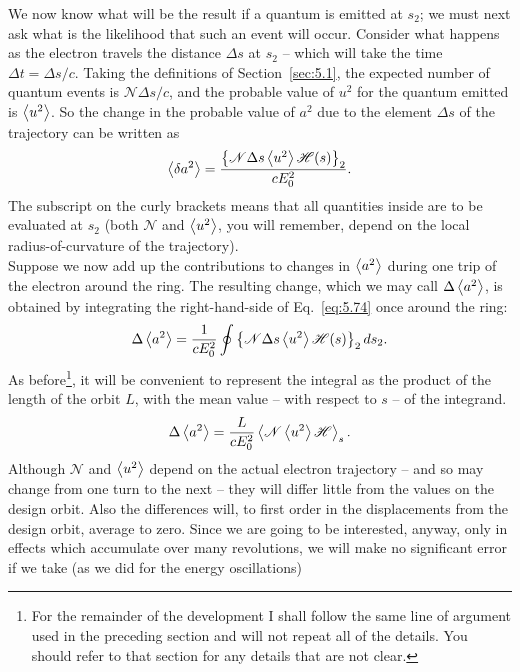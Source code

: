 We now know what will be the result if a quantum is emitted at $s_2$; we must next ask what is the likelihood that such an event will occur. Consider what happens as the electron travels the distance $\Delta s$ at $s_2$ -- which will take the time $\Delta t = \Delta s/c$. Taking the definitions of Section~\ref{sec:5.1}, the expected number of quantum events is $\mathscr{N}\Delta s/c$, and the probable value of $u^2$ for the quantum emitted is $\left< u^2 \right>$. So the change in the probable value of $a^2$ due to the element $\Delta s$ of the trajectory
 can be written as
\begin{align} \label{eq:5.74}
	\left< \delta a^2 \right> = \dfrac{\left\lbrace \mathscr{N} \Delta s \left< u^2 \right> \mathscr{H}(s) \right\rbrace_2}{c E_0^2}.
\end{align}
The subscript on the curly brackets means that all quantities inside are to be evaluated at $s_2$ (both $\mathscr{N}$ and $\left< u^2 \right>$, you will remember, depend on the local radius-of-curvature of the trajectory).\\
Suppose we now add up the contributions to changes in $\left< a^2 \right>$ during one trip of the electron around the ring. The resulting change, which we may call $\Delta \left< a^2 \right>$, is obtained by integrating the right-hand-side of Eq.~\eqref{eq:5.74} once around the ring:
\begin{align}
	\Delta \left< a^2 \right> = \dfrac{1}{c E_0^2} \oint \left\lbrace \mathscr{N} \Delta s \left< u^2 \right> \mathscr{H}(s) \right\rbrace_2 ds_2.
\end{align}
As before\footnote{For the remainder of the development I shall follow the same line of argument used in the preceding section and will not repeat all of the details. You should refer to
that section for any details that are not clear.}, it will be convenient to represent the integral as the product of the length of the orbit $L$, with the mean value -- with respect to $s$ -- of the integrand.
\begin{align}\label{eq:5.76}
	\Delta \left< a^2 \right> = \dfrac{L}{c E_0^2} \left< \mathscr{N}\left< u^2 \right>\mathscr{H} \right>_s.
\end{align}
Although $\mathscr{N}$ and $\left< u^2 \right>$ depend on the actual electron trajectory -- and so may change from one turn to the next -- they will differ little from the values on the design orbit.
 Also the differences will, to first order in the displacements from the design orbit, average to zero. Since we are going to be interested, anyway, only in effects which accumulate over many revolutions, we will make no significant error if we take (as we did for the energy oscillations)
